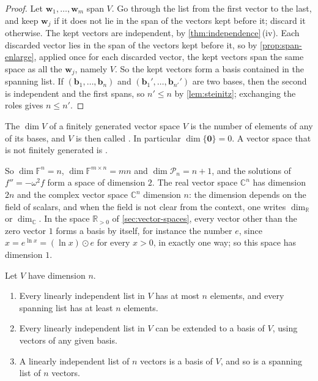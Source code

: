 \begin{proof}
Let $\mathbf w_1,\ldots,\mathbf w_m$ span $V$. Go through the list from the first vector to the last, and keep $\mathbf w_j$ if it does not lie in the span of the vectors kept before it; discard it otherwise. The kept vectors are independent, by \cref{thm:independence}\,(iv). Each discarded vector lies in the span of the vectors kept before it, so by \cref{prop:span-enlarge}, applied once for each discarded vector, the kept vectors span the same space as all the $\mathbf w_j$, namely $V$. So the kept vectors form a basis contained in the spanning list. If $(\mathbf b_1,\ldots,\mathbf b_n)$ and $(\mathbf b_1',\ldots,\mathbf b_{n'}')$ are two bases, then the second is independent and the first spans, so $n'\le n$ by \cref{lem:steinitz}; exchanging the roles gives $n\le n'$.
\end{proof}

\begin{definition}[Dimension]
\label{def:dimension}
The  $\dim V$ of a finitely generated vector space $V$ is the number of elements of any of its bases, and $V$ is then called . In particular $\dim\{\mathbf 0\}=0$. A vector space that is not finitely generated is .
\end{definition}

So $\dim\mathbb F^n=n$, $\dim\mathbb F^{m\times n}=mn$ and $\dim\mathcal P_n=n+1$, and the solutions of $f''=-\omega^2f$ form a space of dimension $2$. The real vector space $\mathbb C^n$ has dimension $2n$ and the complex vector space $\mathbb C^n$ dimension $n$: the dimension depends on the field of scalars, and when the field is not clear from the context, one writes $\dim_{\mathbb R}$ or $\dim_{\mathbb C}$. In the space $\mathbb R_{>0}$ of \cref{sec:vector-spaces}, every vector other than the zero vector $1$ forms a basis by itself, for instance the number $e$, since $x=e^{\ln x}=(\ln x)\odot e$ for every $x>0$, in exactly one way; so this space has dimension $1$.

\begin{theorem}
\label{thm:basis-extension}
Let $V$ have dimension $n$.
\begin{enumerate}
\item Every linearly independent list in $V$ has at most $n$ elements, and every spanning list has at least $n$ elements.
\item Every linearly independent list in $V$ can be extended to a basis of $V$, using vectors of any given basis.
\item A linearly independent list of $n$ vectors is a basis of $V$, and so is a spanning list of $n$ vectors.
\end{enumerate}
\end{theorem}

